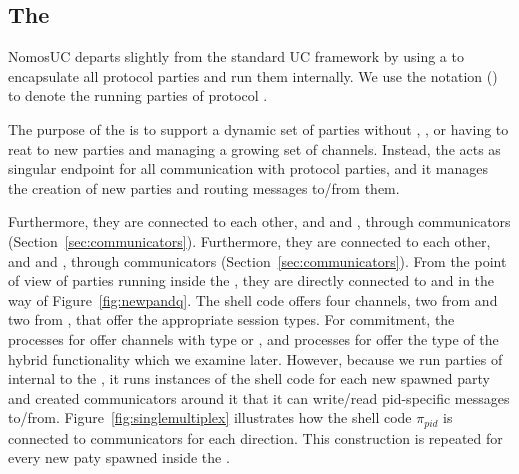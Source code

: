 

\subsection{The \partywrapper}
NomosUC departs slightly from the standard UC framework by using a \partywrapper to encapsulate all protocol parties and run them internally.
We use the notation (\PI) to denote the \partywrapper running parties of protocol \PI.

The purpose of the \partywrapper is to support a dynamic set of parties without \Z, \A, or \F having to reat to new parties and managing a growing set of channels.
Instead, the \partywrapper acts as singular endpoint for all communication with protocol parties, and it manages the creation of new parties and routing messages to/from them.

Furthermore, they are connected to each other, and \Z and \A, through communicators (Section~\ref{sec:communicators}).
Furthermore, they are connected to each other, and \Z and \A, through communicators (Section~\ref{sec:communicators}).
From the point of view of parties running inside the \partywrapper, they are directly connected to \F and \Z in the way of Figure~\ref{fig:newpandq}.
The shell code offers four channels, two from \F and two from \Z, that offer the appropriate session types. 
For commitment, the processes for \Z offer channels with type  or , and processes for \F offer the type of the hybrid functionality \Fro which we examine later.
However, because we run parties of \PI internal to the \partywrapper, it runs instances of the shell code for each new spawned party and created communicators around it that it can write/read pid-specific messages to/from.
Figure~\ref{fig:singlemultiplex} illustrates how the shell code $\pi_{pid}$ is connected to communicators for each direction. This construction is repeated for every new paty spawned inside the \partywrapper.

